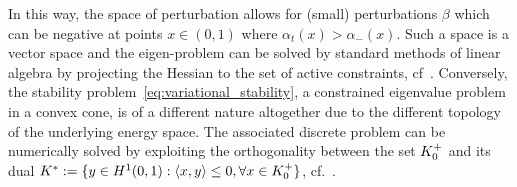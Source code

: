 In this way, the space of perturbation allows for (small) perturbations $\beta$ which can be negative at points $x\in(0,1)$ where $\alpha_t(x)>\alpha_-(x)$. Such a space is a vector space and the eigen-problem can be solved by standard methods of linear algebra by projecting the Hessian to the set of active constraints, cf~\cite{Nocedal1999-zr}.
Conversely, the stability problem~\eqref{eq:variational_stability}, a constrained eigenvalue problem in a convex cone, is of a different nature altogether due to the different topology of the underlying energy space. 
The associated discrete problem can be numerically solved by exploiting the orthogonality between the set $K^+_{0}$ and its dual $K^*:=\{y \in H^1(0,1): \langle x,y \rangle \leq 0, \forall x \in K^+_{0}\}$, cf.~\cite{Moreau1962-fz,Pinto_da_Costa2010-qv}.



